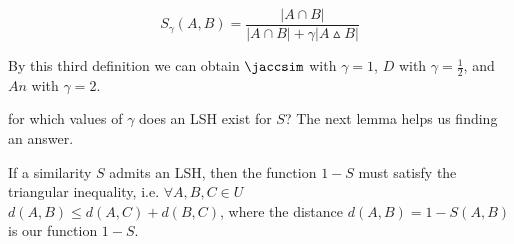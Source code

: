 \begin{defn}
	\begin{equation}
	\displaystyle S_\gamma(A, B) = \frac{|A\cap B|}{|A\cap B| + \gamma|A\vartriangle B|}
	\end{equation}
\end{defn}

By this third definition we can obtain $\jaccsim$ with $\gamma=1$, $D$ with $\gamma=\frac{1}{2}$, and $An$ with $\gamma=2$.

\begin{qst}
	for which values of $\gamma$ does an LSH exist for $S$? The next lemma helps us finding an answer.
\end{qst}

\begin{lem}[by Charikar]
	If a similarity $S$ admits an LSH, then the function $1-S$ must satisfy the triangular inequality, i.e. $\forall A,B,C \in U$ \\ $d(A,B) \leq d(A,C) + d(B,C)$, where the distance $d(A,B) = 1-S(A,B)$ is our function $1-S$.
\end{lem}

